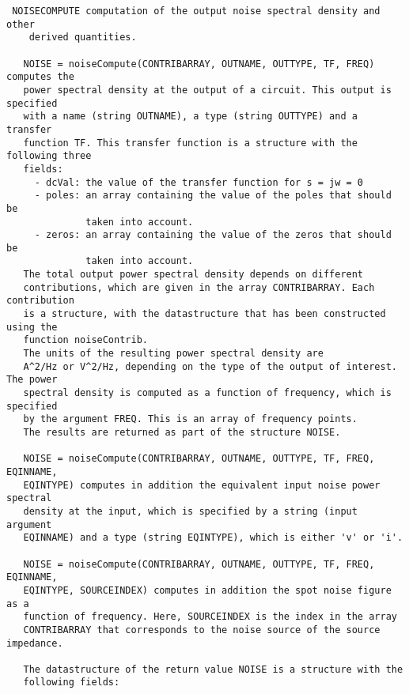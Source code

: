 \begin{verbatim}
 NOISECOMPUTE computation of the output noise spectral density and other 
    derived quantities.
 
   NOISE = noiseCompute(CONTRIBARRAY, OUTNAME, OUTTYPE, TF, FREQ) computes the
   power spectral density at the output of a circuit. This output is specified
   with a name (string OUTNAME), a type (string OUTTYPE) and a transfer
   function TF. This transfer function is a structure with the following three
   fields:  
     - dcVal: the value of the transfer function for s = jw = 0
     - poles: an array containing the value of the poles that should be
              taken into account.
     - zeros: an array containing the value of the zeros that should be
              taken into account.
   The total output power spectral density depends on different
   contributions, which are given in the array CONTRIBARRAY. Each contribution
   is a structure, with the datastructure that has been constructed using the
   function noiseContrib.
   The units of the resulting power spectral density are
   A^2/Hz or V^2/Hz, depending on the type of the output of interest. The power
   spectral density is computed as a function of frequency, which is specified
   by the argument FREQ. This is an array of frequency points.
   The results are returned as part of the structure NOISE.
 
   NOISE = noiseCompute(CONTRIBARRAY, OUTNAME, OUTTYPE, TF, FREQ, EQINNAME,
   EQINTYPE) computes in addition the equivalent input noise power spectral
   density at the input, which is specified by a string (input argument
   EQINNAME) and a type (string EQINTYPE), which is either 'v' or 'i'.
 
   NOISE = noiseCompute(CONTRIBARRAY, OUTNAME, OUTTYPE, TF, FREQ, EQINNAME,
   EQINTYPE, SOURCEINDEX) computes in addition the spot noise figure as a
   function of frequency. Here, SOURCEINDEX is the index in the array
   CONTRIBARRAY that corresponds to the noise source of the source impedance.
 
   The datastructure of the return value NOISE is a structure with the
   following fields:
 

\end{verbatim}
